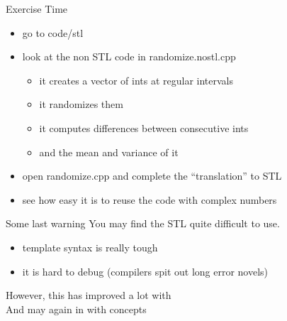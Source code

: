 \begin{frame}[fragile]
  \begin{alertblock}{Exercise Time}
    \begin{itemize}
    \item go to code/stl
    \item look at the non STL code in randomize.nostl.cpp
      \begin{itemize}
        \item it creates a vector of ints at regular intervals
        \item it randomizes them
        \item it computes differences between consecutive ints
        \item and the mean and variance of it
      \end{itemize}
    \item open randomize.cpp and complete the ``translation'' to STL
    \item see how easy it is to reuse the code with complex numbers
    \end{itemize}
  \end{alertblock}
\end{frame}

\begin{frame}[fragile]
  \begin{alertblock}{Some last warning}
    You may find the STL quite difficult to use.
    \begin{itemize}
    \item template syntax is really tough
    \item it is hard to debug (compilers spit out long error novels)
    \end{itemize}
    However, this has improved a lot with  \\
    And may again in  with concepts
  \end{alertblock}
\end{frame}

